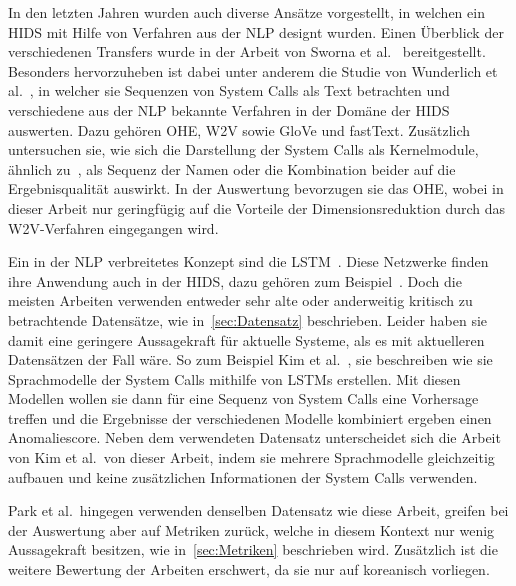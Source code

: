         In den letzten Jahren wurden auch diverse Ansätze vorgestellt, in welchen ein \ac{HIDS} mit Hilfe von Verfahren aus der \ac{NLP} designt wurden.
        Einen Überblick der verschiedenen Transfers wurde in der Arbeit von Sworna et al.~\cite{NLPHIDSSWORNA2022} bereitgestellt.
        Besonders hervorzuheben ist dabei unter anderem die Studie von Wunderlich et al.~\cite{W2VWUNDERLICH2019}, in welcher sie Sequenzen von System Calls als Text betrachten und verschiedene aus der \ac{NLP} bekannte Verfahren in der Domäne der \ac{HIDS} auswerten.
        Dazu gehören \ac{OHE}, \ac{W2V} sowie GloVe und fastText. 
        Zusätzlich untersuchen sie, wie sich die Darstellung der System Calls als Kernelmodule, ähnlich zu~\cite{SYSTEM_STATES}, als Sequenz der Namen oder die Kombination beider auf die Ergebnisqualität auswirkt.
        In der Auswertung bevorzugen sie das \ac{OHE}, wobei in dieser Arbeit nur geringfügig auf die Vorteile der Dimensionsreduktion durch das \ac{W2V}-Verfahren eingegangen wird.

        Ein in der \ac{NLP} verbreitetes Konzept sind die \ac{LSTM}~\cite{LSTMNLP2016,LSTMREVIEWYU2019}.
        Diese Netzwerke finden ihre Anwendung auch in der \ac{HIDS}, dazu gehören zum Beispiel~\cite{LSTMsys, LSTMPARK2021, LSTMSURATKAR2019, NIU2020, BIDIRECTIONALLSTMCHAWLA2019, VARIATIONALLSTMBOUZAR2019}.
        Doch die meisten Arbeiten verwenden entweder sehr alte oder anderweitig kritisch zu betrachtende Datensätze, wie in~\autoref{sec:Datensatz} beschrieben.
        Leider haben sie damit eine geringere Aussagekraft für aktuelle Systeme, als es mit aktuelleren Datensätzen der Fall wäre.
        So zum Beispiel Kim et al.~\cite{LSTMsys}, sie beschreiben wie sie Sprachmodelle der System Calls mithilfe von \acp{LSTM} erstellen.
        Mit diesen Modellen wollen sie dann für eine Sequenz von System Calls eine Vorhersage treffen und die Ergebnisse der verschiedenen Modelle kombiniert ergeben einen Anomaliescore.
        Neben dem verwendeten Datensatz unterscheidet sich die Arbeit von Kim et al.\ von dieser Arbeit, indem sie mehrere Sprachmodelle gleichzeitig aufbauen und keine zusätzlichen Informationen der System Calls verwenden.

        Park et al.\ hingegen verwenden denselben Datensatz wie diese Arbeit, greifen bei der Auswertung aber auf Metriken zurück, welche in diesem Kontext nur wenig Aussagekraft besitzen, wie in~\autoref{sec:Metriken} beschrieben wird.
        Zusätzlich ist die weitere Bewertung der Arbeiten erschwert, da sie nur auf koreanisch vorliegen.~\cite{PARK2021}

